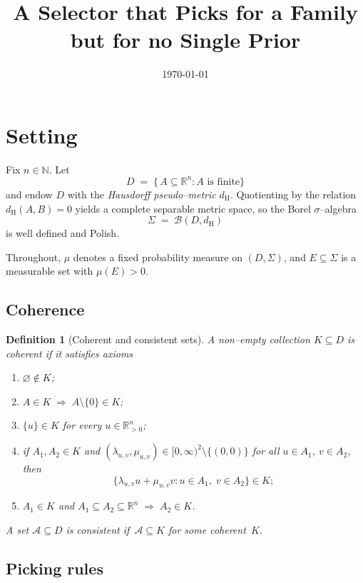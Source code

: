 \documentclass[11pt]{article}
\title{A Selector that Picks for a Family but for no Single Prior}
\author{}
\date{\today}
\newtheorem{definition}{Definition}
\newcommand{\R}{\mathbb{R}}
\newcommand{\N}{\mathbb{N}}
\newcommand{\Haus}{d_{\text{H}}}
\begin{document}
\maketitle

\section{Setting}

Fix $n\in\N$.  
Let 
\[
D \;=\;\bigl\{\,A\subseteq\R^{n} : A\text{ is finite}\bigr\}
\]
and endow $D$ with the \emph{Hausdorff pseudo--metric} $\Haus$.  
Quotienting by the relation $\Haus(A,B)=0$ yields a complete separable metric space, so the Borel $\sigma$--algebra
\[
\Sigma \;=\;\mathscr{B}(D,\Haus)
\]
is well defined and Polish.

Throughout, $\mu$ denotes a fixed probability measure on $(D,\Sigma)$,  
and $E\subseteq\Sigma$ is a measurable set with $\mu(E)>0$.

\subsection{Coherence}

\begin{definition}[Coherent and consistent sets]
A non--empty collection $K\subseteq D$ is \emph{coherent} if it satisfies axioms
\begin{enumerate}[label=\textbf{K\arabic*.}, wide]
  \item $\varnothing\notin K$;
  \item $A\in K\;\Longrightarrow\;A\setminus\{0\}\in K$;
  \item $\{u\}\in K$ for every $u\in\R^{n}_{>0}$;
  \item if $A_1,A_2\in K$ and
        $(\lambda_{u,v},\mu_{u,v})\in[0,\infty)^2\setminus\{(0,0)\}$ for all $u\in A_1$, $v\in A_2$,
        then 
        \[
        \bigl\{\lambda_{u,v}u+\mu_{u,v}v : u\in A_1,\;v\in A_2\bigr\}\in K;
        \]
  \item $A_1\in K$ and $A_1\subseteq A_2\subseteq\R^{n}\;\Longrightarrow\;A_2\in K$.
\end{enumerate}

A set $\mathcal{A}\subseteq D$ is \emph{consistent} if~$\mathcal{A}\subseteq K$ for some coherent~$K$.
\end{definition}

\subsection{Picking rules}
\end{document}
